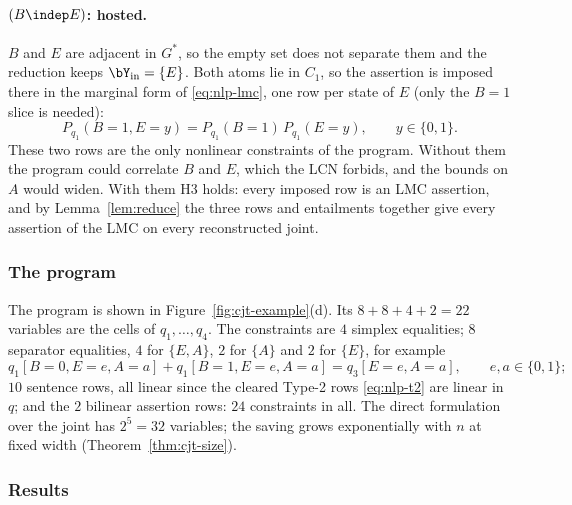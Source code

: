 \paragraph{$(B\indep E)$: hosted.}
$B$ and $E$ are adjacent in $G^\ast$, so the empty set does not separate them and
the reduction keeps $\bY_{\mathrm{in}}=\{E\}$. Both atoms lie in $C_1$, so the
assertion is imposed there in the marginal form of \eqref{eq:nlp-lmc}, one row per
state of $E$ (only the $B{=}1$ slice is needed):
\[
  P_{q_1}(B{=}1,E{=}y)=P_{q_1}(B{=}1)\,P_{q_1}(E{=}y),\qquad y\in\{0,1\}.
\]
These two rows are the only nonlinear constraints of the program. Without them
the program could correlate $B$ and $E$, which the LCN forbids, and the bounds on
$A$ would widen. With them H3 holds: every imposed row is an LMC assertion, and
by Lemma~\ref{lem:reduce} the three rows and entailments together give every
assertion of the LMC on every reconstructed joint.

\subsubsection{The program}

The program is shown in Figure~\ref{fig:cjt-example}(d). Its $8+8+4+2=22$
variables are the cells of $q_1,\dots,q_4$. The constraints are $4$ simplex
equalities; $8$ separator equalities, $4$ for $\{E,A\}$, $2$ for $\{A\}$ and $2$
for $\{E\}$, for example
\[
  q_1[B{=}0,E{=}e,A{=}a]+q_1[B{=}1,E{=}e,A{=}a]=q_3[E{=}e,A{=}a],\qquad
  e,a\in\{0,1\};
\]
$10$ sentence rows, all linear since the cleared Type-2 rows \eqref{eq:nlp-t2}
are linear in $q$; and the $2$ bilinear assertion rows: $24$ constraints in all.
The direct formulation over the joint has $2^5=32$ variables; the saving grows
exponentially with $n$ at fixed width (Theorem~\ref{thm:cjt-size}).

\subsubsection{Results}

